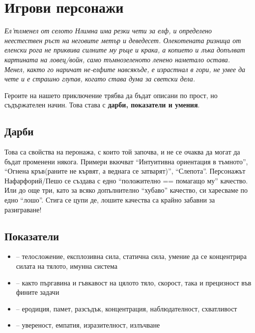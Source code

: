 \section{Игрови персонажи}
\emph{Ел'тлменел от селото Нлимна има резки чети за елф, и определено неестествен ръст на неговите метър и деведесет. Олекотената ризница от еленски рога не приквива силните му ръце и крака, а копието и лъка допълват картината на ловец/войн, само тъмнозеленото ленено наметало остава. Менел, както го наричат не-елфите навсякъде, е израстнал в гори, не умее да чете и е страшно глупав, когато става дума за светски дела.}

Героите на нашето приключение трябва да бъдат описани по прост, но съдържателен начин. Това става с {\bf дарби, показатели и умения}.

\subsection{Дарби}
Това са свойства на перонажа, с които той започва, и не се очаква да могат да бъдат променени някога. Примери вкючват “Интуитивна ориентация в тъмното”, “Огнена кръв(раните не кървят, а веднага се затварят)”, “Слепота”. Персонажът Нафарфорий/Пешо се създава с едно “положително == помагащо му” качество. Или до още три, като за всяко допълнително “хубаво” качество, си харесваме по едно “лошо”. Стига се цупи де, лошите качества са крайно забавни за разиграване!

\subsection{Показатели}
\begin{itemize}
\item {} – телосложение, експлозивна сила, статична сила, умение да се концентрира силата на тялото, имунна система
\item {} – както пъргавина и гъвкавост на цялото тяло, скорост, така и прецизност във фините задачи
\item {} – еродиция, памет, разсъдък, концентрация, наблюдателност, схватливост
\item {} – увереност, емпатия, изразителност, излъчване
\end{itemize}

